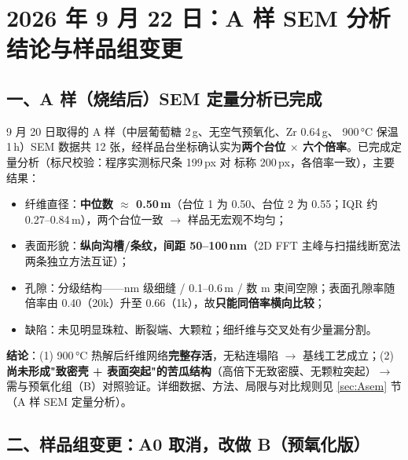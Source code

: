 
\section{2026 年 9 月 22 日：A 样 SEM 分析结论与样品组变更}

\subsection{一、A 样（烧结后）SEM 定量分析已完成}

9 月 20 日取得的 A 样（中层葡萄糖 2\,g、无空气预氧化、Zr 0.64\,g、 900\,°C 保温 1\,h）SEM 数据共 12 张，经样品台坐标确认实为\textbf{两个台位 $\times$ 六个倍率}。已完成定量分析（标尺校验：程序实测标尺条 199\,px 对 标称 200\,px，各倍率一致），主要结果：

\begin{itemize}
  \item 纤维直径：\textbf{中位数 $\approx$ 0.50\,\textmu m}（台位 1 为 0.50、台位 2 为 0.55；IQR 约 0.27--0.84\,\textmu m），两个台位一致 $\rightarrow$ 样品无宏观不均匀；
  \item 表面形貌：\textbf{纵向沟槽/条纹，间距 50--100\,nm}（2D FFT 主峰与扫描线断宽法两条独立方法互证）；
  \item 孔隙：分级结构——nm 级细缝 / 0.1--0.6\,\textmu m / 数 \textmu m 束间空隙；表面孔隙率随倍率由 0.40（20k）升至 0.66（1k），故\textbf{只能同倍率横向比较}；
  \item 缺陷：未见明显珠粒、断裂端、大颗粒；细纤维与交叉处有少量漏分割。
\end{itemize}

\textbf{结论}：(1) 900\,°C 热解后纤维网络\textbf{完整存活}，无粘连塌陷 $\rightarrow$ 基线工艺成立；(2) \textbf{尚未形成"致密壳 + 表面突起"的苦瓜结构}（高倍下无致密膜、无颗粒突起）$\rightarrow$ 需与预氧化组（B）对照验证。详细数据、方法、局限与对比规则见 \ref{sec:Asem} 节（A 样 SEM 定量分析）。

\subsection{二、样品组变更：A0 取消，改做 B（预氧化版）}


